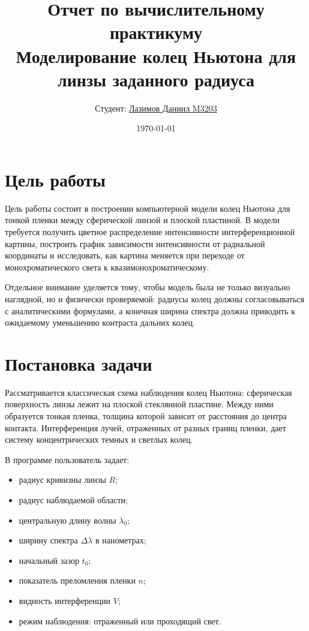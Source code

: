 \documentclass[12pt,a4paper]{article}
\title{
  \textbf{Отчет по вычислительному практикуму}\\
  \large Моделирование колец Ньютона для линзы заданного радиуса
}
\author{Студент: \underline{Лазимов Даниил M3203}}
\date{\today}
\begin{document}
\maketitle

\tableofcontents
\newpage

\section{Цель работы}

Цель работы состоит в построении компьютерной модели колец Ньютона для тонкой пленки между
сферической линзой и плоской пластиной. В модели требуется получить цветное распределение
интенсивности интерференционной картины, построить график зависимости интенсивности от радиальной
координаты и исследовать, как картина меняется при переходе от монохроматического света к
квазимонохроматическому.

Отдельное внимание уделяется тому, чтобы модель была не только визуально наглядной, но и физически
проверяемой: радиусы колец должны согласовываться с аналитическими формулами, а конечная ширина
спектра должна приводить к ожидаемому уменьшению контраста дальних колец.

\section{Постановка задачи}

Рассматривается классическая схема наблюдения колец Ньютона: сферическая поверхность линзы лежит на
плоской стеклянной пластине. Между ними образуется тонкая пленка, толщина которой зависит от
расстояния до центра контакта. Интерференция лучей, отраженных от разных границ пленки, дает систему
концентрических темных и светлых колец.

В программе пользователь задает:
\begin{itemize}
  \item радиус кривизны линзы \(R\);
  \item радиус наблюдаемой области;
  \item центральную длину волны \(\lambda_0\);
  \item ширину спектра \(\Delta\lambda\) в нанометрах;
  \item начальный зазор \(t_0\);
  \item показатель преломления пленки \(n\);
  \item видность интерференции \(V\);
  \item режим наблюдения: отраженный или проходящий свет.
\end{itemize}
\end{document}
